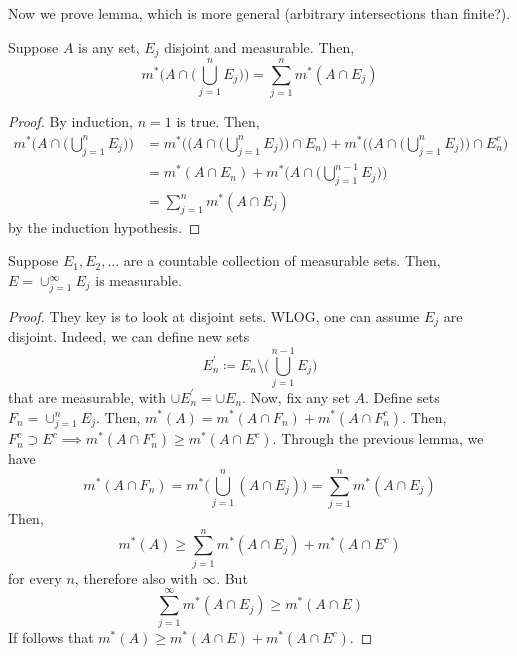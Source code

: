   Now we prove lemma, which is more general (arbitrary intersections than finite?). 

  \begin{lemma} 
    Suppose $A$ is any set, $E_j$ disjoint and measurable. Then, 
    \begin{equation}
      m^\ast \bigg( A \cap \Big( \bigcup_{j=1}^n E_j \Big) \bigg) = \sum_{j=1}^n m^\ast (A \cap E_j)
    \end{equation}
  \end{lemma}
  \begin{proof}
    By induction, $n = 1$ is true. Then, 
    \begin{align}
      m^\ast \bigg( A \cap \Big( \bigcup_{j=1}^n E_j \Big) \bigg) 
        & = m^\ast \Bigg( \bigg( A \cap \Big( \bigcup_{j=1}^n E_j \Big) \bigg) \cap E_n \Bigg) + m^\ast \Bigg( \bigg( A \cap \Big( \bigcup_{j=1}^n E_j \Big) \bigg) \cap E_n^c \Bigg) \\  
        & = m^\ast (A \cap E_n) + m^\ast \bigg( A \cap \Big( \bigcup_{j=1}^{n-1} E_j \Big) \bigg) \\ 
        & = \sum_{j=1}^n m^\ast (A \cap E_j)
    \end{align}
    by the induction hypothesis. 
  \end{proof}

  \begin{theorem}
    Suppose $E_1, E_2, \ldots$ are a countable collection of measurable sets. Then, $E = \cup_{j=1}^\infty E_j$ is measurable. 
  \end{theorem}
  \begin{proof}
    They key is to look at disjoint sets. WLOG, one can assume $E_j$ are disjoint. Indeed, we can define new sets 
    \begin{equation}
      E_n^\prime \coloneqq E_n \setminus \bigg( \bigcup_{j=1}^{n-1} E_j \bigg) 
    \end{equation}
    that are measurable, with $\cup E_n^\prime = \cup E_n$. Now, fix any set $A$. Define sets $F_n = \cup_{j=1}^n E_j$. Then, $m^\ast (A) = m^\ast (A \cap F_n) + m^\ast (A \cap F_n^c)$. Then, $F_n^c \supset E^c \implies m^\ast (A \cap F_n^c) \geq m^\ast (A \cap E^c)$. Through the previous lemma, we have 
    \begin{equation}
      m^\ast (A \cap F_n) = m^\ast \bigg( \bigcup_{j=1}^n (A \cap E_j) \bigg) = \sum_{j=1}^n m^\ast (A \cap E_j) 
    \end{equation}
    Then, 
    \begin{equation}
      m^\ast (A) \geq \sum_{j=1}^n m^\ast (A \cap E_j) + m^\ast (A \cap E^c) 
    \end{equation}
    for every $n$, therefore also with $\infty$. But 
    \begin{equation}
      \sum_{j=1}^\infty m^\ast (A \cap E_j) \geq m^\ast (A \cap E)
    \end{equation}
    If follows that $m^\ast (A) \geq m^\ast (A \cap E) + m^\ast (A \cap E^c)$. 
  \end{proof}

